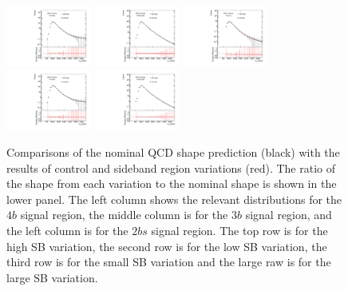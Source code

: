 \begin{figure}[htbp!]
\begin{center}
\includegraphics[width=0.25\textwidth,angle=-90]{figures/boosted/Syst_CRSB/SB_Small_compare_ThreeTag_qcd_hh.pdf}
\includegraphics[width=0.25\textwidth,angle=-90]{figures/boosted/Syst_CRSB/SB_Small_compare_TwoTag_split_qcd_hh.pdf}
\includegraphics[width=0.25\textwidth,angle=-90]{figures/boosted/Syst_CRSB/SB_Large_compare_FourTag_qcd_hh.pdf}
\includegraphics[width=0.25\textwidth,angle=-90]{figures/boosted/Syst_CRSB/SB_Large_compare_ThreeTag_qcd_hh.pdf}
\includegraphics[width=0.25\textwidth,angle=-90]{figures/boosted/Syst_CRSB/SB_Large_compare_TwoTag_split_qcd_hh.pdf}
\end{center}
\caption{Comparisons of the nominal QCD shape prediction (black) with the results of control and sideband region variations (red). The ratio of the shape from each variation to the nominal shape is shown in the lower panel. The left column shows the relevant distributions for the $4b$ signal region, the middle column is for the $3b$ signal region, and the left column is for the $2bs$ signal region. The top row is for the high SB variation, the second row is for the low SB variation, the third row is for the small SB variation and the large raw is for the large SB variation.}
\label{CRSB:QCDShapeSR-SB}
\end{figure}
